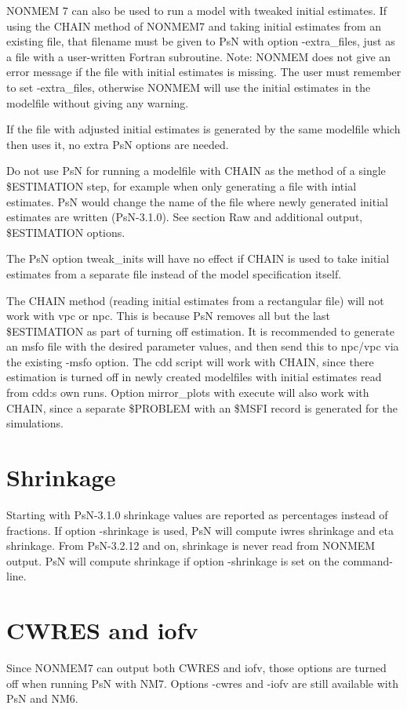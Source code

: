 NONMEM 7 can also be used to run a model with tweaked initial estimates. If using the CHAIN method of NONMEM7 and taking initial estimates from an existing file, that filename must be given to PsN with option -extra\_files, just as a file with a user-written Fortran subroutine. Note: NONMEM does not give an error message if the file with initial estimates is missing. The user must remember to set -extra\_files, otherwise NONMEM will use the initial estimates in the modelfile without giving any warning.

If the file with adjusted initial estimates is generated by the same modelfile which then uses it, no extra PsN options are needed.

Do not use PsN for running a modelfile with CHAIN as the method of a single \$ESTIMATION step, for example when only generating a file with intial estimates. PsN would change the name of the file where newly generated initial estimates are written (PsN-3.1.0). See section Raw and additional output, \$ESTIMATION options.

The PsN option tweak\_inits will have no effect if CHAIN is used to take initial estimates from a separate file instead of the model specification itself.

The CHAIN method (reading initial estimates from a rectangular file) will not work with vpc or npc. This is because PsN removes all but the last \$ESTIMATION as part of turning off estimation. It is recommended to generate an msfo file with the desired parameter values, and then send this to npc/vpc via the existing -msfo option. The cdd script will work with CHAIN, since there estimation is turned off in newly created modelfiles with initial estimates read from cdd:s own runs. Option mirror\_plots with execute will also work with CHAIN, since a separate \$PROBLEM with an \$MSFI record is generated for the simulations.

\section{Shrinkage}

Starting with PsN-3.1.0 shrinkage values are reported as percentages instead of fractions. If option -shrinkage is used, PsN will compute iwres shrinkage and eta shrinkage. From PsN-3.2.12 and on, shrinkage is never read from NONMEM output. PsN will compute shrinkage if option -shrinkage is set on the command-line.

\section{CWRES and iofv}

Since NONMEM7 can output both CWRES and iofv, those options are turned off when running PsN with NM7. Options -cwres and -iofv are still available with PsN and NM6.


